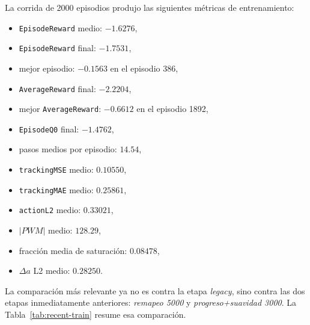 \documentclass[11pt,a4paper]{article}
\begin{document}
La corrida de 2000 episodios produjo las siguientes m\'etricas de entrenamiento:
\begin{itemize}[leftmargin=1.2cm]
    \item \texttt{EpisodeReward} medio: \(-1.6276\),
    \item \texttt{EpisodeReward} final: \(-1.7531\),
    \item mejor episodio: \(-0.1563\) en el episodio 386,
    \item \texttt{AverageReward} final: \(-2.2204\),
    \item mejor \texttt{AverageReward}: \(-0.6612\) en el episodio 1892,
    \item \texttt{EpisodeQ0} final: \(-1.4762\),
    \item pasos medios por episodio: \(14.54\),
    \item \texttt{trackingMSE} medio: \(0.10550\),
    \item \texttt{trackingMAE} medio: \(0.25861\),
    \item \texttt{actionL2} medio: \(0.33021\),
    \item \(|PWM|\) medio: \(128.29\),
    \item fracci\'on media de saturaci\'on: \(0.08478\),
    \item \(\Delta a\) L2 medio: \(0.28250\).
\end{itemize}

La comparaci\'on m\'as relevante ya no es contra la etapa \emph{legacy}, sino contra las dos etapas inmediatamente anteriores: \emph{remapeo 5000} y \emph{progreso+suavidad 3000}. La Tabla~\ref{tab:recent-train} resume esa comparaci\'on.
\end{document}
